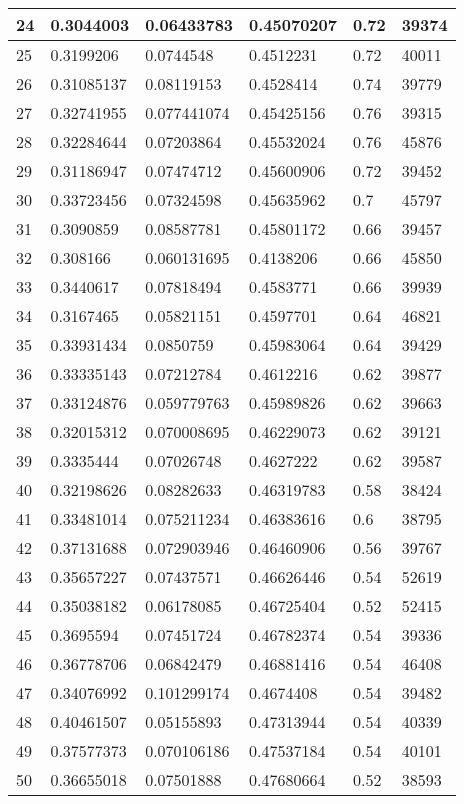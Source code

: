 \begin{longtable}{|l|l|l|l|l|l|}
24 & 0.3044003 & 0.06433783 & 0.45070207 & 0.72 & 39374 \\ \hline 
25 & 0.3199206 & 0.0744548 & 0.4512231 & 0.72 & 40011 \\ \hline 
26 & 0.31085137 & 0.08119153 & 0.4528414 & 0.74 & 39779 \\ \hline 
27 & 0.32741955 & 0.077441074 & 0.45425156 & 0.76 & 39315 \\ \hline 
28 & 0.32284644 & 0.07203864 & 0.45532024 & 0.76 & 45876 \\ \hline 
29 & 0.31186947 & 0.07474712 & 0.45600906 & 0.72 & 39452 \\ \hline 
30 & 0.33723456 & 0.07324598 & 0.45635962 & 0.7 & 45797 \\ \hline 
31 & 0.3090859 & 0.08587781 & 0.45801172 & 0.66 & 39457 \\ \hline 
32 & 0.308166 & 0.060131695 & 0.4138206 & 0.66 & 45850 \\ \hline 
33 & 0.3440617 & 0.07818494 & 0.4583771 & 0.66 & 39939 \\ \hline 
34 & 0.3167465 & 0.05821151 & 0.4597701 & 0.64 & 46821 \\ \hline 
35 & 0.33931434 & 0.0850759 & 0.45983064 & 0.64 & 39429 \\ \hline 
36 & 0.33335143 & 0.07212784 & 0.4612216 & 0.62 & 39877 \\ \hline 
37 & 0.33124876 & 0.059779763 & 0.45989826 & 0.62 & 39663 \\ \hline 
38 & 0.32015312 & 0.070008695 & 0.46229073 & 0.62 & 39121 \\ \hline 
39 & 0.3335444 & 0.07026748 & 0.4627222 & 0.62 & 39587 \\ \hline 
40 & 0.32198626 & 0.08282633 & 0.46319783 & 0.58 & 38424 \\ \hline 
41 & 0.33481014 & 0.075211234 & 0.46383616 & 0.6 & 38795 \\ \hline 
42 & 0.37131688 & 0.072903946 & 0.46460906 & 0.56 & 39767 \\ \hline 
43 & 0.35657227 & 0.07437571 & 0.46626446 & 0.54 & 52619 \\ \hline 
44 & 0.35038182 & 0.06178085 & 0.46725404 & 0.52 & 52415 \\ \hline 
45 & 0.3695594 & 0.07451724 & 0.46782374 & 0.54 & 39336 \\ \hline 
46 & 0.36778706 & 0.06842479 & 0.46881416 & 0.54 & 46408 \\ \hline 
47 & 0.34076992 & 0.101299174 & 0.4674408 & 0.54 & 39482 \\ \hline 
48 & 0.40461507 & 0.05155893 & 0.47313944 & 0.54 & 40339 \\ \hline 
49 & 0.37577373 & 0.070106186 & 0.47537184 & 0.54 & 40101 \\ \hline 
50 & 0.36655018 & 0.07501888 & 0.47680664 & 0.52 & 38593 \\ \hline 
\end{longtable}